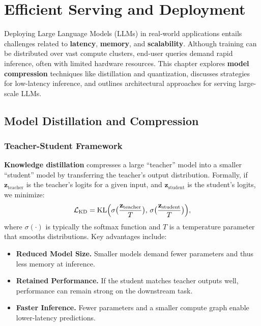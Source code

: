 \chapter{Efficient Serving and Deployment}
\label{chap:serving_deployment}

\noindent
Deploying Large Language Models (LLMs) in real-world applications entails challenges related to \textbf{latency}, \textbf{memory}, and \textbf{scalability}. Although training can be distributed over vast compute clusters, end-user queries demand rapid inference, often with limited hardware resources. This chapter explores \textbf{model compression} techniques like distillation and quantization, discusses strategies for low-latency inference, and outlines architectural approaches for serving large-scale LLMs.

\section{Model Distillation and Compression}
\label{sec:distillation_compression}

\subsection{Teacher-Student Framework}
\noindent
\textbf{Knowledge distillation} compresses a large “teacher” model into a smaller “student” model by transferring the teacher’s output distribution. Formally, if \(\mathbf{z}_\text{teacher}\) is the teacher’s logits for a given input, and \(\mathbf{z}_\text{student}\) is the student’s logits, we minimize:
\[
\mathcal{L}_\text{KD} = \text{KL}\Bigl(\sigma\bigl(\frac{\mathbf{z}_\text{teacher}}{T}\bigr),\, \sigma\bigl(\frac{\mathbf{z}_\text{student}}{T}\bigr)\Bigr),
\]
where \(\sigma(\cdot)\) is typically the softmax function and \(T\) is a temperature parameter that smooths distributions. Key advantages include:
\begin{itemize}
    \item \textbf{Reduced Model Size.} Smaller models demand fewer parameters and thus less memory at inference.
    \item \textbf{Retained Performance.} If the student matches teacher outputs well, performance can remain strong on the downstream task.
    \item \textbf{Faster Inference.} Fewer parameters and a smaller compute graph enable lower-latency predictions.
\end{itemize}

